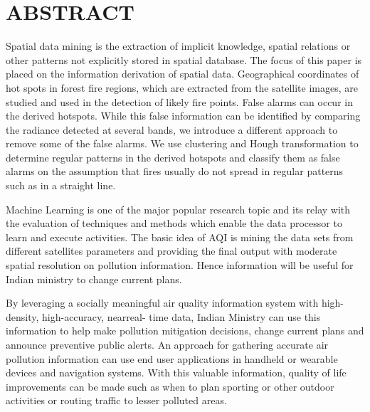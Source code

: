\documentclass[12pt]{report}	%
\begin{document}





\chapter*{ABSTRACT}
Spatial data mining is the extraction of implicit
knowledge, spatial relations or other patterns not
explicitly stored in spatial database. The focus of this
paper is placed on the information derivation of spatial
data. Geographical coordinates of hot spots in forest fire
regions, which are extracted from the satellite images, are
studied and used in the detection of likely fire points.
False alarms can occur in the derived hotspots. While this
false information can be identified by comparing the
radiance detected at several bands, we introduce a
different approach to remove some of the false alarms.
We use clustering and Hough transformation to determine
regular patterns in the derived hotspots and classify them
as false alarms on the assumption that fires usually do not
spread in regular patterns such as in a straight line.

Machine Learning is one of the major popular research topic and its relay with the
evaluation of techniques and methods which enable the data processor to learn
and execute activities. The basic idea of AQI is mining the data sets from different
satellites parameters and providing the final output with moderate spatial resolution
on pollution information. Hence information will be useful for Indian ministry to
change current plans.

By leveraging a socially meaningful air quality information
system with high-density, high-accuracy, nearreal-
time data, Indian Ministry can use this information
to help make pollution mitigation decisions, change
current plans and announce preventive public alerts.
An approach for gathering accurate air pollution information
can use end user applications in handheld
or wearable devices and navigation systems. With this
valuable information, quality of life improvements can
be made such as when to plan sporting or other outdoor
activities or routing traffic to lesser polluted areas.

\newpage
\end{document}
